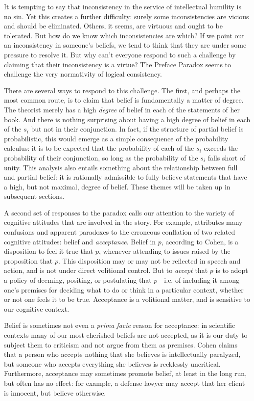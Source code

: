 It is tempting to say that inconsistency in the service of intellectual humility
is no sin. Yet this creates a further difficulty: surely some inconsistencies
are vicious and should be eliminated. Others, it seems, are virtuous and ought
to be tolerated. But how do we know which inconsistencies are which? If we point
out an inconsistency in someone's beliefs, we tend to think that they are under
some pressure to resolve it. But why can't everyone respond to such a challenge
by claiming that their inconsistency is a virtue? The Preface Paradox seems to
challenge the very normativity of logical consistency.

There are several ways to respond to this challenge. The first, and perhaps the
most common route, is to claim that belief is fundamentally a matter of degree.
The theorist merely has a high {\em degree} of belief in each of the statements
of her book. And there is nothing surprising about having a high degree of
belief in each of the $s_i$ but not in their conjunction. In fact, if the
structure of partial belief is probabilistic, this would emerge as a simple
consequence of the probability calculus: it is to be expected that the
probability of each of the $s_i$ exceeds the probability of their conjunction,
so long as the probability of the $s_i$ falls short of unity. This analysis also
entails something about the relationship between full and partial belief: it is
rationally admissible to fully believe statements that have a high, but not
maximal, degree of belief. These themes will be taken up in subsequent sections.

A second set of responses to the paradox calls our attention to the variety of
cognitive attitudes that are involved in the story. For example,
\citet{cohen1992essay} attributes many confusions and apparent paradoxes to the
erroneous conflation of two related cognitive attitudes: belief and {\em
acceptance}. Belief in $p$, according to Cohen, is a disposition to feel it true
that $p$, whenever attending to issues raised by the proposition that $p.$ This
disposition may or may not be reflected in speech and action, and is not under
direct volitional control. But to {\em accept} that $p$ is to adopt a policy of
deeming, positing, or postulating that $p$---i.e. of including it among one's
premises for deciding what to do or think in a particular context, whether or
not one feels it to be true. Acceptance is a volitional matter, and is sensitive
to our cognitive context.

Belief is sometimes not even a {\em prima facie} reason for acceptance: in
scientific contexts many of our most cherished beliefs are not accepted, as it
is our duty to subject them to criticism and not argue from them as premises.
Cohen claims that a person who accepts nothing that she believes is
intellectually paralyzed, but someone who accepts everything she believes is
recklessly uncritical. Furthermore, acceptance may sometimes promote belief, at
least in the long run, but often has no effect: for example, a defense lawyer
may accept that her client is innocent, but believe otherwise.  

